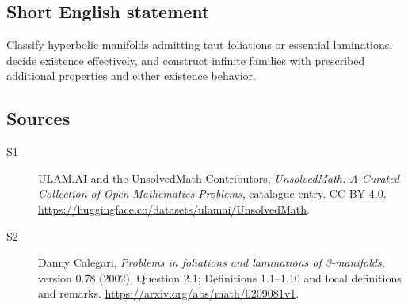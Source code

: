 \documentclass[11pt]{article}
\begin{document}
\subsection{Short English statement}
Classify hyperbolic manifolds admitting taut foliations or essential laminations, decide existence effectively, and construct infinite families with prescribed additional properties and either existence behavior.
\subsection{Sources}
\begin{description}
\item[\hypertarget{source:statement:1}{S1}] ULAM.AI and the UnsolvedMath Contributors, \emph{UnsolvedMath: A Curated Collection of Open Mathematics Problems}, catalogue entry. CC BY 4.0. \url{https://huggingface.co/datasets/ulamai/UnsolvedMath}.
\item[\hypertarget{source:statement:2}{S2}] Danny Calegari, \emph{Problems in foliations and laminations of 3-manifolds}, version 0.78 (2002), Question 2.1; Definitions 1.1--1.10 and local definitions and remarks. \url{https://arxiv.org/abs/math/0209081v1}.
\end{description}
\label{end:statement}
\end{document}
